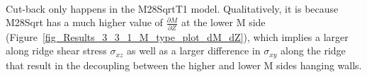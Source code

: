 ~\\
Cut-back only happens in the M28SqrtT1 model. Qualitatively, it is because M28Sqrt has a much higher value of $\frac{\partial M}{\partial Z}$ at the lower M side (Figure~\hyperref[fig_Results_3_3_1_M_type_plot_dM_dZ]{\ref{fig_Results_3_3_1_M_type_plot_dM_dZ}}), which implies a larger along ridge shear stress $\sigma_{xz}$ as well as a larger difference in $\sigma_{xy}$ along the ridge that result in the decoupling between the higher and lower M sides hanging walls. 

